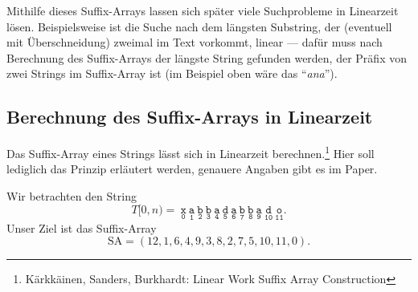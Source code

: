 Mithilfe dieses Suffix-Arrays lassen sich später viele Suchprobleme in Linearzeit lösen. Beispielsweise ist die Suche nach dem längsten Substring, der (eventuell mit Überschneidung) zweimal im Text vorkommt, linear --- dafür muss nach Berechnung des Suffix-Arrays der längste String gefunden werden, der Präfix von zwei Strings im Suffix-Array ist (im Beispiel oben wäre das ``\emph{ana}'').

\subsection{Berechnung des Suffix-Arrays in Linearzeit}\label{sec:SALinear}

Das Suffix-Array eines Strings lässt sich in Linearzeit berechnen.\footnote{Kärkkäinen, Sanders, Burkhardt: Linear Work Suffix Array Construction} Hier soll lediglich das Prinzip erläutert werden, genauere Angaben gibt es im Paper.

Wir betrachten den String
\begin{equation*}
  T[0,n) = \ \underset{\texttt{0}}{\texttt{x}}\ \underset{\texttt{1}}{\texttt{a}}\ \underset{\texttt{2}}{\texttt{b}}\ \underset{\texttt{3}}{\texttt{b}}\ \underset{\texttt{4}}{\texttt{a}}\ \underset{\texttt{5}}{\texttt{d}}\ \underset{\texttt{6}}{\texttt{a}}\ \underset{\texttt{7}}{\texttt{b}}\ \underset{\texttt{8}}{\texttt{b}}\ \underset{\texttt{9}}{\texttt{a}}\ \underset{\texttt{10}}{\texttt{d}}\ \underset{\texttt{11}}{\texttt{o}}\text{.}
\end{equation*}
Unser Ziel ist das Suffix-Array
\begin{equation*}
  \text{SA} = \left( 12,1,6,4,9,3,8,2,7,5,10,11,0 \right)\text{.}
\end{equation*}


